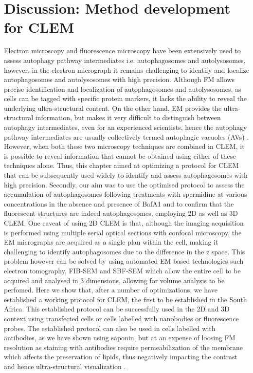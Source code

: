 \section{Discussion: Method development for CLEM}

Electron microscopy and fluorescence microscopy have been extensively used to assess autophagy pathway intermediates i.e. autophagosomes and autolysosomes, however, in the electron micrograph it remains challenging  to identify and localize autophagosomes and autolysosomes with high precision. Although FM allows precise identification and localization of autophagosomes and autolysosomes, as cells can be tagged with specific protein markers, it lacks the ability to reveal the underlying ultra-structural content. On the other hand, EM provides the ultra-structural information, but makes it very difficult to distinguish between autophagy intermediates, even for an experienced scientists, hence the autophagy pathway intermediates are usually collectively termed autophagic vacuoles (AVs) \citep{Eskelinen2008,klionsky2016}. However, when both these two microscopy techniques are combined in CLEM, it is possible to reveal information that cannot be obtained using either of these techniques alone. Thus, this chapter aimed at optimizing a protocol for CLEM that can be subsequently used widely to identify and assess autophagosomes with high precision. Secondly, our aim was to use the optimised protocol to assess the accumulation of autophagosomes following treatments with spermidine at various concentrations in the absence and presence of BafA1 and to confirm that the fluorescent structures are indeed autophagosomes, employing 2D as well as 3D CLEM. One caveat of using 2D CLEM is that, although the imaging acquisition is performed using multiple serial optical sections with confocal microscopy, the EM micrographs are acquired as a single plan within the cell, making it challenging to identify autophagosomes due to the difference in the z space. This problem however can be solved by using automated EM based technologies such electron tomography, FIB-SEM and SBF-SEM \citep{Burel2018,Duke2014,Russell2017,Yla-Anttila2009} which allow the entire cell to be acquired and analysed in 3 dimensions, allowing for volume analysis to be perfomed. Here we show that, after a number of optimizations, we have established a working protocol for CLEM, the first to be established in the South Africa. This established protocol can be successfully used in the 2D and 3D context using transfected cells or cells labelled with nanobodies or fluorescence probes. The established protocol can also be used in cells labelled with antibodies, as we have shown using saponin, but at an expense of loosing FM resolution as staining with antibodies require permeabilization of the membrane which affects the preservation of lipids, thus negatively impacting the contrast and hence ultra-structural visualization \citep{Eskelinen2008}.

